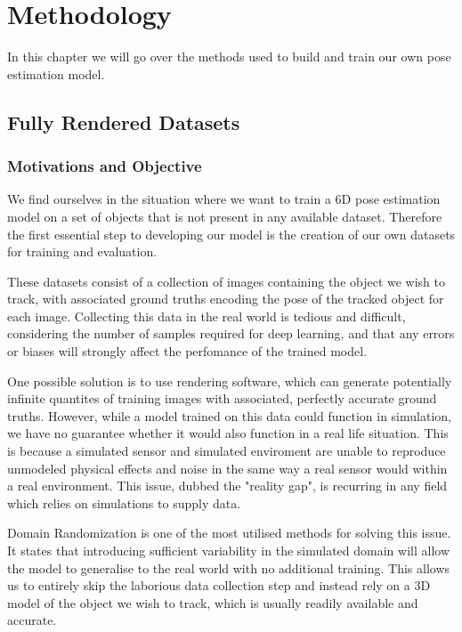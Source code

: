\chapter{Methodology}

In this chapter we will go over the methods used to build and train our own pose estimation model.

\section{Fully Rendered Datasets}

\subsection{Motivations and Objective}

We find ourselves in the situation where we want to train a 6D pose estimation model on a set of objects that is not present in any available dataset. Therefore the first essential step to developing our model is the creation of our own datasets for training and evaluation.

These datasets consist of a collection of images containing the object we wish to track, with associated ground truths encoding the pose of the tracked object for each image. Collecting this data in the real world is tedious and difficult, considering the number of samples required for deep learning, and that any errors or biases will strongly affect the perfomance of the trained model. 

One possible solution is to use rendering software, which can generate potentially infinite quantites of training images with associated, perfectly accurate ground truths. However, while a model trained on this data could function in simulation, we have no guarantee whether it would also function in a real life situation. This is because a simulated sensor and simulated enviroment are unable to reproduce unmodeled physical effects and noise in the same way a real sensor would within a real environment. This issue, dubbed the "reality gap"\cite{domainRandomization2}, is recurring in any field which relies on simulations to supply data.

Domain Randomization\cite{domainRandomization} is one of the most utilised methods for solving this issue. It states that introducing sufficient variability in the simulated domain will allow the model to generalise to the real world with no additional training. This allows us to entirely skip the laborious data collection step and instead rely on a 3D model of the object we wish to track, which is usually readily available and accurate.

